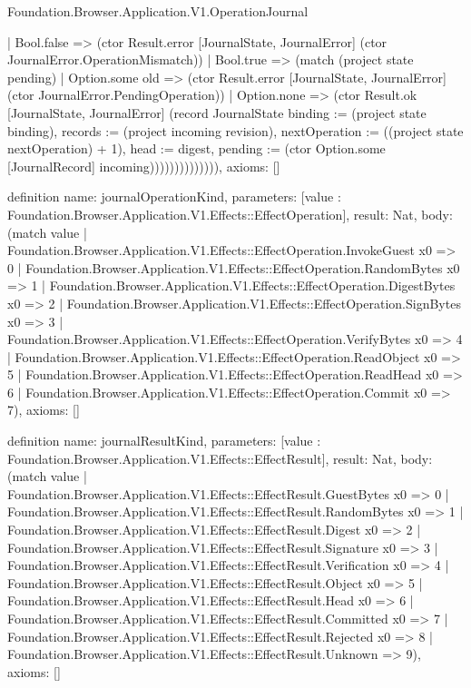 \begin{lexlean}{Foundation.Browser.Application.V1.OperationJournal}
\begin{semanticmodule}
{                      | Bool.false => (ctor Result.error [JournalState, JournalError] (ctor JournalError.OperationMismatch))
                      | Bool.true => (match (project state pending)
                        | Option.some old => (ctor Result.error [JournalState, JournalError] (ctor JournalError.PendingOperation))
                        | Option.none => (ctor Result.ok [JournalState, JournalError] (record JournalState {binding := (project state binding), records := (project incoming revision), nextOperation := ((project state nextOperation) + 1), head := digest, pending := (ctor Option.some [JournalRecord] incoming)}))))))))))))),
  axioms: []
}

definition{
  name: journalOperationKind,
  parameters: [value : Foundation.Browser.Application.V1.Effects::EffectOperation],
  result: Nat,
  body: (match value
    | Foundation.Browser.Application.V1.Effects::EffectOperation.InvokeGuest x0 => 0
    | Foundation.Browser.Application.V1.Effects::EffectOperation.RandomBytes x0 => 1
    | Foundation.Browser.Application.V1.Effects::EffectOperation.DigestBytes x0 => 2
    | Foundation.Browser.Application.V1.Effects::EffectOperation.SignBytes x0 => 3
    | Foundation.Browser.Application.V1.Effects::EffectOperation.VerifyBytes x0 => 4
    | Foundation.Browser.Application.V1.Effects::EffectOperation.ReadObject x0 => 5
    | Foundation.Browser.Application.V1.Effects::EffectOperation.ReadHead x0 => 6
    | Foundation.Browser.Application.V1.Effects::EffectOperation.Commit x0 => 7),
  axioms: []
}

definition{
  name: journalResultKind,
  parameters: [value : Foundation.Browser.Application.V1.Effects::EffectResult],
  result: Nat,
  body: (match value
    | Foundation.Browser.Application.V1.Effects::EffectResult.GuestBytes x0 => 0
    | Foundation.Browser.Application.V1.Effects::EffectResult.RandomBytes x0 => 1
    | Foundation.Browser.Application.V1.Effects::EffectResult.Digest x0 => 2
    | Foundation.Browser.Application.V1.Effects::EffectResult.Signature x0 => 3
    | Foundation.Browser.Application.V1.Effects::EffectResult.Verification x0 => 4
    | Foundation.Browser.Application.V1.Effects::EffectResult.Object x0 => 5
    | Foundation.Browser.Application.V1.Effects::EffectResult.Head x0 => 6
    | Foundation.Browser.Application.V1.Effects::EffectResult.Committed x0 => 7
    | Foundation.Browser.Application.V1.Effects::EffectResult.Rejected x0 => 8
    | Foundation.Browser.Application.V1.Effects::EffectResult.Unknown => 9),
  axioms: []
}


\end{semanticmodule}
\end{lexlean}
